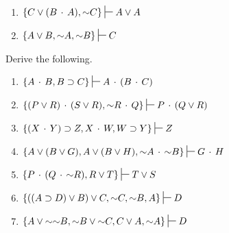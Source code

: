 \begin{enumerate}[label=(\arabic*)]
\item $\{C \eor (B \eand  A),  \enot C\} \sststile{}{} A \eor A$		%


\item $\{A \eor B, \enot A, \enot B\} \sststile{}{} C$				%

\end{enumerate}


\noindent\problempart Derive the following.
\begin{enumerate}[label=(\arabic*)]

\item $\{A \eand B, B \eif C\} \sststile{}{} A \eand (B \eand C) $ %


\item $\{(P \eor R) \eand (S \eor R), \enot R \eand Q\} \sststile{}{} P \eand (Q \eor R)$		%
\item $\{(X \eand Y) \eif Z, X \eand W, W \eif Y\} \sststile{}{} Z$ 	%


\item $\{A \eor  (B \eor  G), A \eor  (B \eor  H), \enot A \eand \enot B\} \sststile{}{} G \eand H $		%

\item $\{P \eand (Q \eand \enot R), R \eor T\} \sststile{}{} T \eor S$ 		%
\item $\{((A \eif D) \eor B) \eor C, \enot C, \enot B, A\} \sststile{}{} D$
\item $\{A \eor \enot\enot B, \enot B \eor \enot C, C \eor A, \enot A\} \sststile{}{}D		$			%
\end{enumerate}

